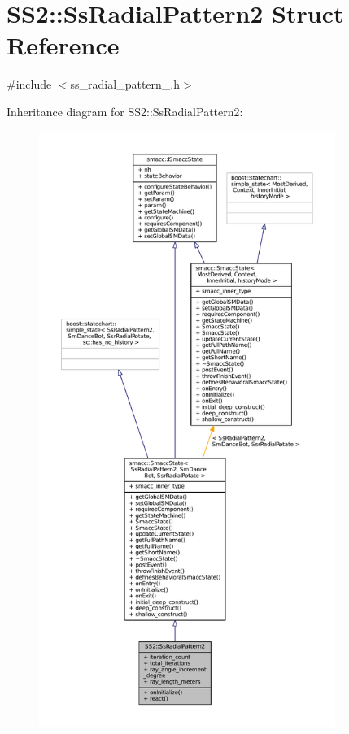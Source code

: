 \hypertarget{structSS2_1_1SsRadialPattern2}{}\section{S\+S2\+:\+:Ss\+Radial\+Pattern2 Struct Reference}
\label{structSS2_1_1SsRadialPattern2}


{\ttfamily \#include $<$ss\+\_\+radial\+\_\+pattern\+\_.\+h$>$}



Inheritance diagram for S\+S2\+:\+:Ss\+Radial\+Pattern2\+:
\nopagebreak
\begin{figure}[H]
\begin{center}
\leavevmode
\includegraphics[height=550pt]{structSS2_1_1SsRadialPattern2__inherit__graph}
\end{center}
\end{figure}


